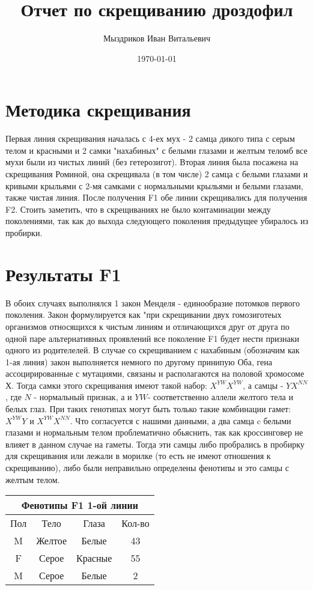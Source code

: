 \documentclass[12pt,a4paper]{article}
\title{
Отчет по скрещиванию дроздофил
}
\author{Мыздриков Иван Витальевич}
\date{\today}
\begin{document}
\maketitle
\newpage


\section{Методика скрещивания}
Первая линия скрещивания началась с 4-ех мух - 2 самца дикого типа с серым телом и красными и 2 самки "нахабиных" с белыми глазами и желтым теломб все мухи были из чистых линий (без гетерозигот).
Вторая линия была посажена на скрещивания Роминой, она скрещивала (в том числе) 2 самца с белыми глазами и кривыми крыльями с 2-мя самками с нормальными крыльями и белыми глазами, также чистая линия.
После получения F1 обе линии скрещивались для получения F2. Стоить заметить, что в скрещиваниях не было контаминации между поколениями, так как до выхода следующего поколения предыдущее убиралось из пробирки.





\section{Результаты F1}
В обоих случаях выполнялся 1 закон Менделя - единообразие потомков первого поколения.
Закон формулируется как "при скрещивании двух гомозиготеых организмов относящихся к чистым линиям и отличающихся друг от друга по одной паре альтернативных проявлений все поколение F1 будет нести признаки одного из родителелей.
В случае со скрещиванием с нахабиным (обозначим как 1-ая линия) закон выполняется немного по другому принипую Оба, гена ассоцирированные с мутациями, связаны и располагаются на половой хромосоме Х.
Тогда самки этого скрещивания имеют такой набор: $X^{YW} X^{YW}$, а самцы - $Y X^{NN}$, где $N$ - нормальный признак, а и $Y W$- соответственно аллели желтого тела и белых глаз.
При таких генотипах могут быть только такие комбинации гамет: $X^{YW} Y$ и $X^{YW} X^{NN}$. Что согласуется с нашими данными, а два самца c белыми глазами и нормальным телом проблематично обьяснить, так как кроссинговер не влияет в данном случае на гаметы.
Тогда эти самцы либо пробрались в пробирку для скрещивания или лежали в морилке (то есть не имеют отношения к скрещиванию), либо были неправильно определены фенотипы и это самцы с желтым телом.
       
\begin{center}
    \begin{tabular}{|c|c|c|c|}  \hline
        \multicolumn{4}{|c|}{Фенотипы F1 1-ой линии} \\ \hline
        Пол & Тело   & Глаза   & Кол-во \\ \hline
        M   & Желтое & Белые   & 43 \\ \hline
        F   & Серое  & Красные & 55 \\ \hline
        M   & Серое  & Белые & 2 \\ \hline

    \end{tabular}
\end{center}
\end{document}
